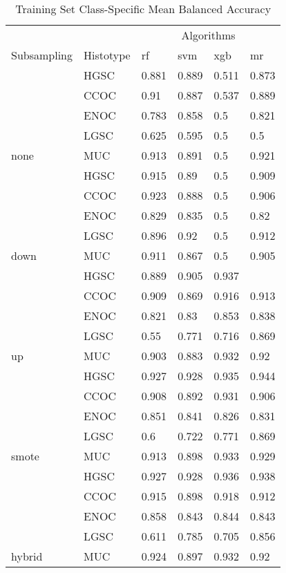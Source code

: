 \documentclass[
]{report}
\begin{document}
\begin{table}

\caption{\label{tab:train-bal-accuracy-class-table}Training Set Class-Specific Mean Balanced Accuracy}
\centering
\begin{tabular}[t]{l|l|l|l|l|l}
\hline
\multicolumn{2}{c|}{ } & \multicolumn{4}{c}{Algorithms} \\
\cline{3-6}
Subsampling & Histotype & rf & svm & xgb & mr\\
\hline
 & HGSC & 0.881 & 0.889 & 0.511 & 0.873\\
\cline{2-6}
 & CCOC & 0.91 & 0.887 & 0.537 & 0.889\\
\cline{2-6}
 & ENOC & 0.783 & 0.858 & 0.5 & 0.821\\
\cline{2-6}
 & LGSC & 0.625 & 0.595 & 0.5 & 0.5\\
\cline{2-6}
\multirow{-5}{*}{\raggedright\arraybackslash none} & MUC & 0.913 & 0.891 & 0.5 & 0.921\\
\cline{1-6}
 & HGSC & 0.915 & 0.89 & 0.5 & 0.909\\
\cline{2-6}
 & CCOC & 0.923 & 0.888 & 0.5 & 0.906\\
\cline{2-6}
 & ENOC & 0.829 & 0.835 & 0.5 & 0.82\\
\cline{2-6}
 & LGSC & 0.896 & 0.92 & 0.5 & 0.912\\
\cline{2-6}
\multirow{-5}{*}{\raggedright\arraybackslash down} & MUC & 0.911 & 0.867 & 0.5 & 0.905\\
\cline{1-6}
 & HGSC & 0.889 & 0.905 & 0.937 & \cellcolor[HTML]{90ee90}{0.946}\\
\cline{2-6}
 & CCOC & 0.909 & 0.869 & 0.916 & 0.913\\
\cline{2-6}
 & ENOC & 0.821 & 0.83 & 0.853 & 0.838\\
\cline{2-6}
 & LGSC & 0.55 & 0.771 & 0.716 & 0.869\\
\cline{2-6}
\multirow{-5}{*}{\raggedright\arraybackslash up} & MUC & 0.903 & 0.883 & 0.932 & 0.92\\
\cline{1-6}
 & HGSC & 0.927 & 0.928 & 0.935 & 0.944\\
\cline{2-6}
 & CCOC & 0.908 & 0.892 & 0.931 & 0.906\\
\cline{2-6}
 & ENOC & 0.851 & 0.841 & 0.826 & 0.831\\
\cline{2-6}
 & LGSC & 0.6 & 0.722 & 0.771 & 0.869\\
\cline{2-6}
\multirow{-5}{*}{\raggedright\arraybackslash smote} & MUC & 0.913 & 0.898 & 0.933 & 0.929\\
\cline{1-6}
 & HGSC & 0.927 & 0.928 & 0.936 & 0.938\\
\cline{2-6}
 & CCOC & 0.915 & 0.898 & 0.918 & 0.912\\
\cline{2-6}
 & ENOC & 0.858 & 0.843 & 0.844 & 0.843\\
\cline{2-6}
 & LGSC & 0.611 & 0.785 & 0.705 & 0.856\\
\cline{2-6}
\multirow{-5}{*}{\raggedright\arraybackslash hybrid} & MUC & 0.924 & 0.897 & 0.932 & 0.92\\
\hline
\end{tabular}
\end{table}
\end{document}
